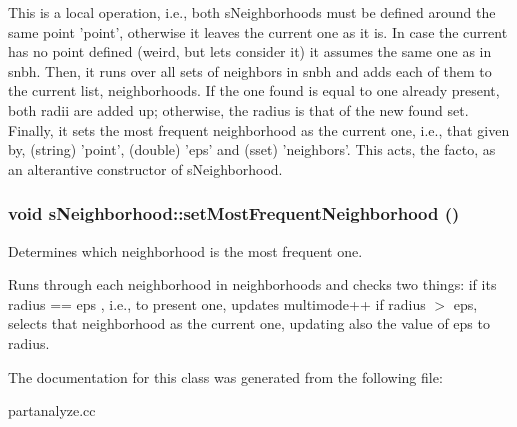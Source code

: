 This is a local operation, i.e., both s\-Neighborhoods must be defined around the same point 'point', otherwise it leaves the current one as it is. In case the current has no point defined (weird, but lets consider it) it assumes the same one as in snbh. Then, it runs over all sets of neighbors in snbh and adds each of them to the current list, neighborhoods. If the one found is equal to one already present, both radii are added up; otherwise, the radius is that of the new found set. Finally, it sets the most frequent neighborhood as the current one, i.e., that given by, (string) 'point', (double) 'eps' and (sset) 'neighbors'. This acts, the facto, as an alterantive constructor of s\-Neighborhood.
\subsubsection{\setlength{\rightskip}{0pt plus 5cm}void s\-Neighborhood::set\-Most\-Frequent\-Neighborhood ()}\label{classsNeighborhood_a2}


Determines which neighborhood is the most frequent one. 

Runs through each neighborhood in neighborhoods and checks two things: if its radius == eps , i.e., to present one, updates multimode++ if radius $>$ eps, selects that neighborhood as the current one, updating also the value of eps to radius.

The documentation for this class was generated from the following file:\begin{CompactItemize}
\item 
partanalyze.cc\end{CompactItemize}
